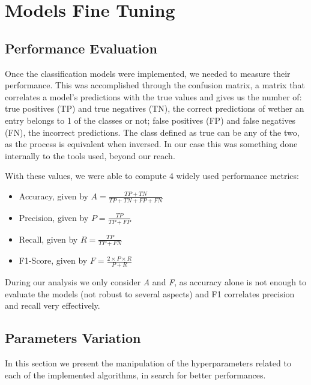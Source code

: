 \documentclass[extendedabs]{recpad2k}
\begin{document}
\section{Models Fine Tuning}\label{parameters}

\subsection{Performance Evaluation}

Once the classification models were implemented, we needed to measure their performance.
This was accomplished through the confusion matrix, a matrix that correlates a model's predictions with the true values and gives us the number of: 
true positives (TP) and true negatives (TN), the correct predictions of wether an entry belongs to 1 of the classes or not; false positives (FP) and 
false negatives (FN), the incorrect predictions.
The class defined as true can be any of the two, as the process is equivalent when inversed.
In our case this was something done internally to the tools used, beyond our reach.

With these values, we were able to compute 4 widely used performance metrics:
\begin{itemize}[noitemsep,nolistsep]
\item Accuracy, given by $A = \frac{TP + TN}{TP + TN + FP + FN}$
\vspace{3pt}
\item Precision, given by $P = \frac{TP}{TP + FP}$
\vspace{3pt}
\item Recall, given by $R = \frac{TP}{TP + FN}$
\vspace{3pt}
\item F1-Score, given by $F = \frac{2 \times P \times R}{P + R}$
\vspace{3pt}
\end{itemize}
During our analysis we only consider \textit{A} and \textit{F}, as accuracy alone is not enough to evaluate the models (not robust to several aspects) and F1 
correlates precision and recall very effectively.

\subsection{Parameters Variation}

In this section we present the manipulation of the hyperparameters related to each of the implemented algorithms, in search for better performances.
\end{document}
